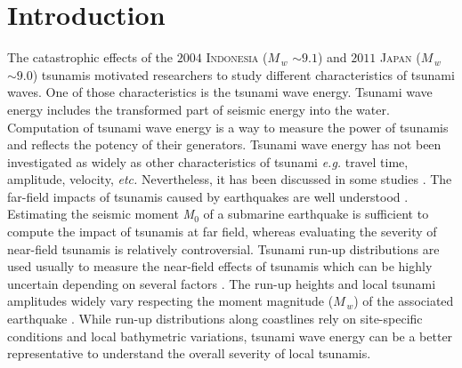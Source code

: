 \documentclass[12pt]{llncs}
\begin{document}
\section{Introduction}

The catastrophic effects of the $2004$ \textsc{Indonesia} ($M_{\,w}$ $\sim 9.1$) and $2011$ \textsc{Japan} ($M_{\,w}$ $\sim 9.0$) tsunamis motivated researchers to study different characteristics of tsunami waves. One of those characteristics is the tsunami wave energy. Tsunami wave energy includes the transformed part of seismic energy into the water. Computation of tsunami wave energy is a way to measure the power of tsunamis and reflects the potency of their generators. Tsunami wave energy has not been investigated as widely as other characteristics of tsunami \emph{e.g.} travel time, amplitude, velocity, \emph{etc.} Nevertheless, it has been discussed in some studies \citep{Kajiura1970, Ward80, Dotsenko1997, Velichko2002, Okal2003, Kowalik2007, López-Venegas2015, Omira2016}. The far-field impacts of tsunamis caused by earthquakes are well understood \citep{Ruiz2015}. Estimating the seismic moment \textit{M}$_0$ of a submarine earthquake is sufficient to compute the impact of tsunamis at far field, whereas evaluating the severity of near-field tsunamis is relatively controversial. Tsunami run-up distributions are used usually to measure the near-field effects of tsunamis which can be highly uncertain depending on several factors \citep{Geist2002, Dutykh2011c, Ruiz2015}. The run-up heights and local tsunami amplitudes widely vary respecting the moment magnitude ($M_{\,w}$) of the associated earthquake \citep{Dutykh2012a}. While run-up distributions along coastlines rely on site-specific conditions and local bathymetric variations, tsunami wave energy can be a better representative to understand the overall severity of local tsunamis.
\end{document}
